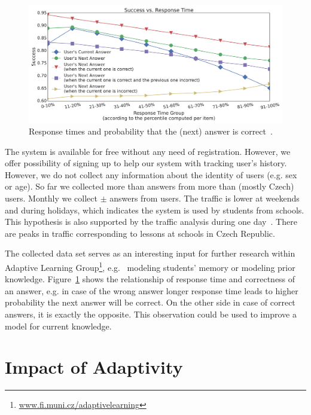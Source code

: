 \documentclass[table,color,cover,twoside,nolot,nolof]{fithesis3/fithesis3}
\begin{document}
\begin{figure}[h]
	\begin{center}
		\includegraphics[width=\textwidth]{figure/response_time}
		\caption{Response times and probability that the (next) answer is correct~\cite{papousek2015analysis}.}
		\label{figure:response_time}
	\end{center}
\end{figure}

The system is available for free without any need of registration. However, we
offer possibility of signing up to help our system with tracking user's
history. However, we do not collect any information about the identity of users
(e.g. sex or age). So far we collected more than  answers
from more than  (mostly Czech) users. Monthly we collect $\pm$
 answers from  users. The traffic is lower at
weekends and during holidays, which indicates the system is used by students
from schools. This hypothesis is also supported by the traffic analysis during
one day~\cite{stanislav2015factual}. There are peaks in traffic corresponding
to lessons at schools in Czech Republic.

The collected data set serves as an interesting input for further research
within Adaptive Learning Group\footnote{\url{www.fi.muni.cz/adaptivelearning}},
e.g.~\cite{pelanek2015modeling} modeling students' memory or
\cite{niznan2015student} modeling prior knowledge.
Figure~\ref{figure:response_time} shows the relationship of response time and
correctness of an answer, e.g. in case of the wrong answer longer response time
leads to higher probability the next answer will be correct. On the other side
in case of correct answers, it is exactly the opposite. This observation could be
used to improve a model for current knowledge.

\section{Impact of Adaptivity}
\end{document}
